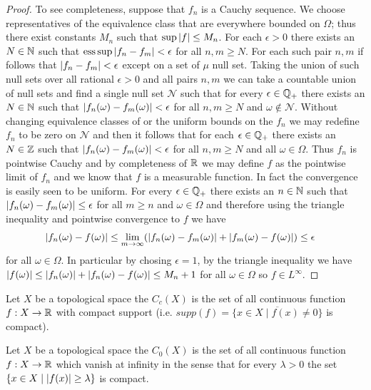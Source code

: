 \begin{proof}
To see completeness, suppose that $f_n$ is a Cauchy sequence.  We choose representatives of the equivalence class that are everywhere bounded on $\Omega$; thus there exist constants $M_n$ such that $\sup \left \vert f \right \vert \leq M_n$.  For each $\epsilon > 0$ there exists an $N \in \mathbb{N}$ such that $\operatorname*{ess\,sup} \left \vert f_n - f_m \right \vert < \epsilon$ for all $n,m \geq N$.  For each such pair $n,m$ if follows that $\left \vert f_n - f_m \right \vert < \epsilon$ except on a set of $\mu$ null set.  Taking the union of such null sets over all rational $\epsilon > 0$ and all pairs $n,m$ we can take a countable union of null sets and find a single null set $\mathcal{N}$ such that for every $\epsilon \in \mathbb{Q}_+$ there exists an $N \in \mathbb{N}$ such that $\left \vert f_n(\omega) - f_m(\omega) \right \vert < \epsilon$ for all $n,m \geq N$ and $\omega \notin \mathcal{N}$.   Without changing equivalence classes of or the uniform bounds on the $f_n$ we may redefine $f_n$ to be zero on $\mathcal{N}$ and then it follows that for each $\epsilon \in \mathbb{Q}_+$ there exists an $N \in \mathbb{Z}$ such that $\left \vert f_n(\omega) - f_m(\omega) \right \vert < \epsilon$ for all $n,m \geq N$ and all $\omega \in \Omega$.  Thus $f_n$ is pointwise Cauchy and by completeness of $\mathbb{R}$ we may define $f$ as the pointwise limit of $f_n$ and we know that $f$ is a measurable function.  In fact the convergence is easily seen to be uniform.  For every $\epsilon \in \mathbb{Q}_+$ there exists an $n \in \mathbb{N}$ such that $\left \vert f_n(\omega) - f_m(\omega) \right \vert \leq \epsilon$ for all $m \geq n$ and $\omega \in \Omega$ and therefore using the triangle inequality and pointwise convergence to $f$ we have
\begin{align*}
\left \vert f_n(\omega) - f(\omega) \right \vert &\leq \lim_{m \to \infty} (\left \vert f_n(\omega) - f_m(\omega) \right \vert + \left \vert f_m(\omega) - f(\omega) \right \vert ) \leq \epsilon
\end{align*} 
for all $\omega \in \Omega$.  In particular by chosing $\epsilon = 1$, by the triangle inequality we have $\left \vert f(\omega) \right \vert \leq \left \vert f_n(\omega) \right \vert + \left \vert f_n(\omega) - f(\omega) \right \vert \leq M_n + 1$ for all $\omega \in \Omega$ so $f \in L^\infty$.  
\end{proof}

\begin{defn}Let $X$ be a topological space the $C_c(X)$ is the set of
  all continuous function $f : X \to \mathbb{R}$ with compact support
  (i.e. $supp(f) = \overline{\{x \in X \mid f(x) \neq 0 \}}$ is
  compact).
\end{defn}

\begin{defn}Let $X$ be a topological space the $C_0(X)$ is the set of
  all continuous function $f : X \to \mathbb{R}$ which vanish at infinity
  in the sense that for every $\lambda >0$ the set $\lbrace x \in X \mid
  \left \vert f(x) \right \vert \geq \lambda \rbrace$ is  compact.
\end{defn}

